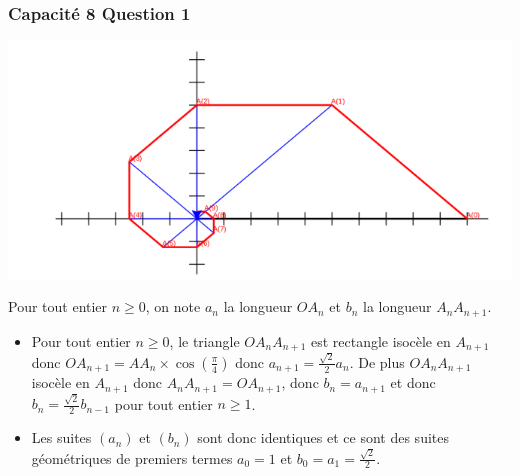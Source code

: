 \documentclass[11pt, hyperref={urlcolor=red,%
            linkcolor=blue, %
            colorlinks=true}]{beamer}
\begin{document}
\begin{frame}
\frametitle{Capacité 8 Question 1}
\label{capacite8}

\begin{center}
\includegraphics[scale=0.2]{images/capacite8.png}
\end{center}



Pour tout entier $n\geqslant 0$, on note $a_{n}$ la longueur $OA_{n}$ et $b_{n}$ la longueur $A_{n}A_{n+1}$.


\begin{itemize}
	\pause \item Pour tout entier $n\geqslant 0$, le triangle $OA_{n}A_{n+1}$ est rectangle isocèle en $A_{n+1}$ donc $OA_{n+1}=AA_{n} \times \cos \left(\frac{\pi}{4}\right)$ donc $a_{n+1}=\frac{\sqrt{2}}{2}a_{n}$. De plus $OA_{n}A_{n+1}$ isocèle en $A_{n+1}$  donc $A_{n}A_{n+1}=OA_{n+1}$, donc $b_{n}=a_{n+1}$ et donc $b_{n}=\frac{\sqrt{2}}{2}b_{n-1}$ pour tout entier $n \geqslant 1$.
	
\pause \item Les suites $(a_{n})$ et $(b_{n})$ sont donc identiques et ce sont des suites géométriques de premiers termes $a_{0}=1$ et $b_{0}=a_{1}=\frac{\sqrt{2}}{2}$.

\end{itemize}


\end{frame}
\end{document}
